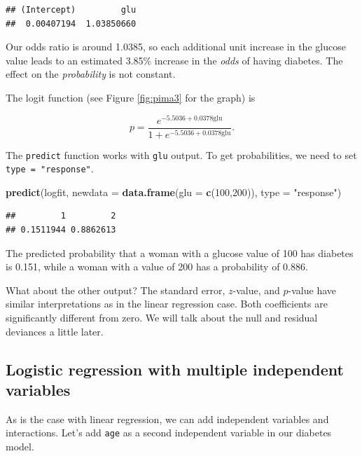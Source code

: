 \documentclass[
]{book}
\newenvironment{Shaded}{\begin{snugshade}}{\end{snugshade}}
\newcommand{\AttributeTok}[1]{\textcolor[rgb]{0.13,0.29,0.53}{#1}}
\newcommand{\DecValTok}[1]{\textcolor[rgb]{0.00,0.00,0.81}{#1}}
\newcommand{\FunctionTok}[1]{\textcolor[rgb]{0.13,0.29,0.53}{\textbf{#1}}}
\newcommand{\NormalTok}[1]{#1}
\newcommand{\StringTok}[1]{\textcolor[rgb]{0.31,0.60,0.02}{#1}}
\theoremstyle{definition}
\theoremstyle{definition}
\theoremstyle{definition}
\theoremstyle{definition}
\theoremstyle{remark}
\begin{document}
\begin{verbatim}
## (Intercept)         glu 
##  0.00407194  1.03850660
\end{verbatim}

Our odds ratio is around 1.0385, so each additional unit increase in the glucose value leads to an estimated 3.85\% increase in the \emph{odds} of having diabetes. The effect on the \emph{probability} is not constant.

The logit function (see Figure \ref{fig:pima3} for the graph) is

\[p=\frac{e^{-5.5036+0.0378\text{glu}}}{1+e^{-5.5036+0.0378\text{glu}}}.\]

The \texttt{predict} function works with \texttt{glu} output. To get probabilities, we need to set \texttt{type\ =\ "response"}.

\begin{Shaded}
\begin{Highlighting}[]
\FunctionTok{predict}\NormalTok{(logfit, }\AttributeTok{newdata =} \FunctionTok{data.frame}\NormalTok{(}\AttributeTok{glu =} \FunctionTok{c}\NormalTok{(}\DecValTok{100}\NormalTok{,}\DecValTok{200}\NormalTok{)),  }
        \AttributeTok{type =} \StringTok{"response"}\NormalTok{)}
\end{Highlighting}
\end{Shaded}

\begin{verbatim}
##         1         2 
## 0.1511944 0.8862613
\end{verbatim}

The predicted probability that a woman with a glucose value of 100 has diabetes is 0.151, while a woman with a value of 200 has a probability of 0.886.

What about the other output? The standard error, \(z\)-value, and \(p\)-value have similar interpretations as in the linear regression case. Both coefficients are significantly different from zero. We will talk about the null and residual deviances a little later.

\subsection*{Logistic regression with multiple independent variables}\label{logistic-regression-with-multiple-independent-variables}

As is the case with linear regression, we can add independent variables and interactions. Let's add \texttt{age} as a second independent variable in our diabetes model.
\end{document}
